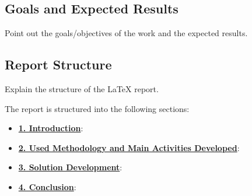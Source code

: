 \subsection{Goals and Expected Results}

Point out the goals/objectives of the work and the expected results.

\subsection{Report Structure}

Explain the structure of the LaTeX report.

The report is structured into the following sections:

\begin{itemize}
    \item \hyperref[section:introduction]{\textbf{1. Introduction}}: 
    \item \hyperref[section:methodology]{\textbf{2. Used Methodology and Main Activities Developed}}: 
    \item \hyperref[section:development]{\textbf{3. Solution Development}}: 
    \item \hyperref[section:conclusion]{\textbf{4. Conclusion}}:
\end{itemize}
